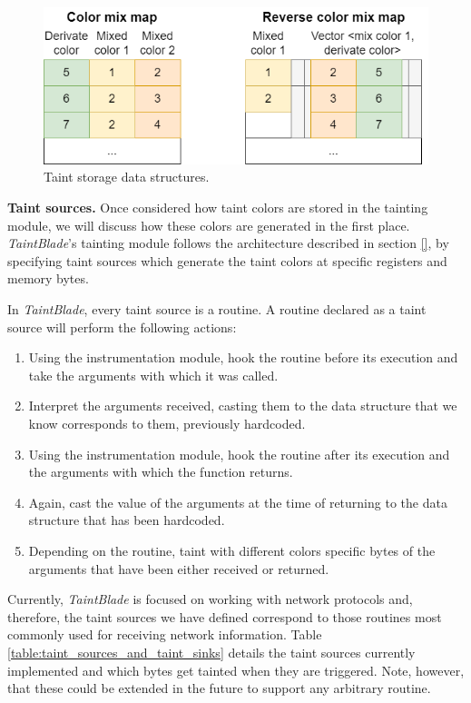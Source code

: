 \documentclass[conference]{IEEEtran}
\begin{document}
\begin{figure}
    \centerline{\includegraphics[width=0.9\columnwidth]{images/colormixtaintarch.drawio.png}}
    \caption{Taint storage data structures.}
    \label{figure:colormixtaintarch}
\end{figure}

\textbf{Taint sources.} Once considered how taint colors are stored in the tainting
module, we will discuss how these colors are generated in the first place. \textit{TaintBlade}'s
tainting module follows the architecture described in section \ref{}, by specifying taint sources
which generate the taint colors at specific registers and memory bytes.

In \textit{TaintBlade}, every taint source is a routine. A routine declared as
a taint source will perform the following actions:
\begin{enumerate}
    \item Using the instrumentation module, hook the routine before its execution and
          take the arguments with which it was called.
    \item Interpret the arguments received, casting them to the data structure that we
          know corresponds to them, previously hardcoded.
    \item Using the instrumentation module, hook the routine after its execution and the
          arguments with which the function returns.
    \item Again, cast the value of the arguments at the time of returning to the data
          structure that has been hardcoded.
    \item Depending on the routine, taint with different colors specific bytes of the
          arguments that have been either received or returned.
\end{enumerate}

Currently, \textit{TaintBlade} is focused on working with network protocols
and, therefore, the taint sources we have defined correspond to those routines
most commonly used for receiving network information. Table
\ref{table:taint_sources_and_taint_sinks} details the taint sources currently
implemented and which bytes get tainted when they are triggered. Note, however,
that these could be extended in the future to support any arbitrary routine.
\end{document}
